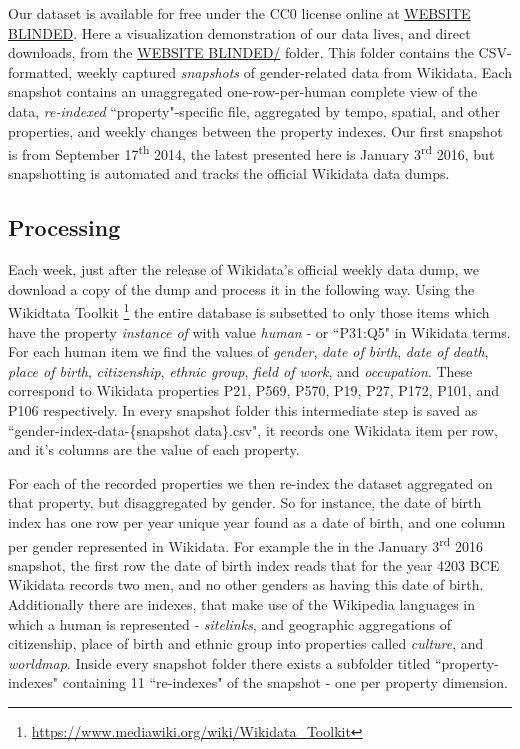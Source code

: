 \documentclass[letterpaper]{article}
\begin{document}
Our dataset is available for free under the CC0 license online at  \url{WEBSITE BLINDED}. Here a visualization demonstration of our data lives, and direct downloads, from the \url{WEBSITE BLINDED/} folder. 	This folder contains the CSV-formatted, weekly captured \textit{snapshots} of gender-related data from Wikidata. Each snapshot contains an unaggregated one-row-per-human complete view of the data, \textit{re-indexed} ``property"-specific file, aggregated by tempo, spatial, and other properties, and weekly changes between the property indexes. Our first snapshot is from September 17\textsuperscript{th} 2014, the latest presented here is January 3\textsuperscript{rd} 2016, but snapshotting is automated and tracks the official Wikidata data dumps.

\subsection{Processing}
Each week, just after the release of Wikidata's official weekly data dump, we download a copy of the dump and process it in the following way. Using the Wikidtata Toolkit \footnote{\url{https://www.mediawiki.org/wiki/Wikidata_Toolkit}} the entire database is subsetted to only those items which have the property \textit{instance of} with value \textit{human} - or ``P31:Q5" in Wikidata terms. For each human item we find the values of \textit{gender}, \textit{date of birth}, \textit{date of death}, \textit{place of birth}, \textit{citizenship}, \textit{ethnic group}, \textit{field of work}, and \textit{occupation}. These correspond to Wikidata properties P21, P569, P570, P19, P27, P172, P101, and P106 respectively.  In every snapshot folder this intermediate step is saved as ``gender-index-data-\{snapshot data\}.csv", it records one Wikidata item per row, and it's columns are the value of each property.
 
For each of the recorded properties we then re-index the dataset aggregated on that property, but disaggregated by gender. So for instance, the date of birth index has one row per year unique year found as a date of birth, and one column per gender represented in Wikidata. For example the in the January 3\textsuperscript{rd} 2016 snapshot, the first row the date of birth index reads that for the year 4203 BCE Wikidata records two men, and no other genders as having this date of birth. Additionally there are indexes, that make use of the Wikipedia languages in which a human is represented - \textit{sitelinks}, and geographic aggregations of citizenship, place of birth and ethnic group into properties called \textit{culture}, and \textit{worldmap}. Inside every snapshot folder there exists a subfolder titled ``property-indexes" containing 11 ``re-indexes" of the snapshot - one per property dimension.
 
\end{document}
